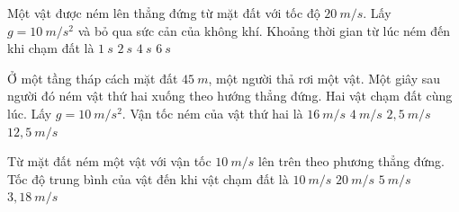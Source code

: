 \begin{vidu}%
Một vật được ném lên thẳng đứng từ mặt đất với tốc độ $20\ m/s$. Lấy $g = 10\ m/s^2$ và bỏ qua sức cản của không khí. Khoảng thời gian từ lúc ném đến khi chạm đất là
\choice
{$1\ s$}
{$2\ s$}
{\True $4\ s$}
{$6\ s$}

\end{vidu}
\begin{vidu}
Ở một tầng tháp cách mặt đất $45\ m$, một người thả rơi một vật. Một giây sau người đó ném vật thứ hai xuống theo hướng thẳng đứng. Hai vật chạm đất cùng lúc. Lấy $g=10\ m/s^2$. Vận tốc ném của vật thứ hai là
\choice
{$16\ m/s$}
{$4\ m/s$}
{$2,5\ m/s$}
{\True $12,5\ m/s$}
\end{vidu}

\begin{vidu}
Từ mặt đất ném một vật với vận tốc $10\ m/s$ lên trên theo phương thẳng đứng. Tốc độ trung bình của vật đến khi vật chạm đất là
\choice
{$10\ m/s$}
{$20\ m/s$}
{\True $5\ m/s$}
{$3,18\ m/s$}

\end{vidu}

